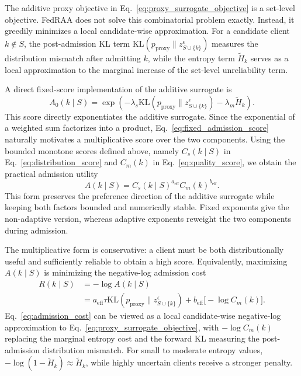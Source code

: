 \documentclass[conference]{IEEEtran}
\theoremstyle{definition}
\theoremstyle{remark}
\begin{document}
The additive proxy objective in Eq.~\eqref{eq:proxy_surrogate_objective} is a set-level objective.
FedRAA does not solve this combinatorial problem exactly.
Instead, it greedily minimizes a local candidate-wise approximation.
For a candidate client $k\notin S$, the post-admission KL term $\mathrm{KL}(p_{\mathrm{proxy}}\|z_{S\cup\{k\}}^\epsilon)$ measures the distribution mismatch after admitting $k$, while the entropy term $\widetilde H_k$ serves as a local approximation to the marginal increase of the set-level unreliability term.

A direct fixed-score implementation of the additive surrogate is
\begin{equation}
\label{eq:fixed_admission_score}
A_0(k\mid S)
=
\exp
\left(
-\lambda_s
\mathrm{KL}
\left(
p_{\mathrm{proxy}}\|z_{S\cup\{k\}}^\epsilon
\right)
-
\lambda_m\widetilde H_k
\right).
\end{equation}
This score directly exponentiates the additive surrogate. Since the exponential
of a weighted sum factorizes into a product, Eq.~\eqref{eq:fixed_admission_score}
naturally motivates a multiplicative score over the two components. Using the
bounded monotone scores defined above, namely $C_s(k\mid S)$ in
Eq.~\eqref{eq:distribution_score} and $C_m(k)$ in Eq.~\eqref{eq:quality_score},
we obtain the practical admission utility
\begin{equation}
\label{eq:adaptive_utility}
A(k\mid S)
=
C_s(k\mid S)^{a_{\mathrm{eff}}}
C_m(k)^{b_{\mathrm{eff}}}.
\end{equation}
This form preserves the preference direction of the additive surrogate while
keeping both factors bounded and numerically stable. Fixed exponents give the
non-adaptive version, whereas adaptive exponents reweight the two components
during admission.


The multiplicative form is conservative: a client must be both distributionally useful and sufficiently reliable to obtain a high score.
Equivalently, maximizing $A(k\mid S)$ is minimizing the negative-log admission cost
\begin{align}
\label{eq:admission_cost}
R(k\mid S)
&=
-\log A(k\mid S)\\
&=
a_{\mathrm{eff}}\tau
\mathrm{KL}\!\left(p_{\mathrm{proxy}}\|z_{S\cup\{k\}}^\epsilon\right)
+
b_{\mathrm{eff}}\big[-\log C_m(k)\big].
\end{align}
Eq.~\eqref{eq:admission_cost} can be viewed as a local candidate-wise negative-log approximation to Eq.~\eqref{eq:proxy_surrogate_objective}, with $-\log C_m(k)$ replacing the marginal entropy cost and the forward KL measuring the post-admission distribution mismatch.
For small to moderate entropy values, $-\log(1-\widetilde H_k)\approx \widetilde H_k$, while highly uncertain clients receive a stronger penalty.
\end{document}
